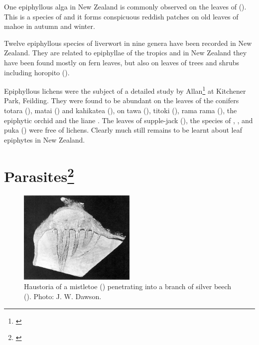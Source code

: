 One epiphyllous alga in New Zealand is commonly observed on the leaves of  ().
This is a species of  and it forms conspicuous reddish patches on old leaves of mahoe in autumn and winter.

Twelve epiphyllous species of liverwort in nine genera have been recorded in New Zealand.
They are related to epiphyllae of the tropics and in New Zealand they have been found mostly on fern leaves, but also on leaves of trees and shrubs including horopito ().

Epiphyllous lichens were the subject of a detailed study by Allan\footnote{\cite{zahlbruckner1928epiphyllous}} at Kitchener Park, Feilding.
They were found to be abundant on the leaves of the conifers totara (), matai () and kahikatea (), on tawa (), titoki (), rama rama (), the epiphytic orchid  and the liane .
The leaves of supple-jack (), the species of , ,  and puka () were free of lichens.
Clearly much still remains to be learnt about leaf epiphytes in New Zealand.

\section[Parasites]{Parasites\footnote{\cite{fineran1974parasitic}}}

\begin{figure}
	\includegraphics[width=0.5\textwidth]{graphics/figure57mistletoe-haustoria.jpg}
	\centering
	\caption[Haustoria of a mistletoe]{Haustoria of a mistletoe () penetrating into a branch of silver beech ().
	Photo: J. W. Dawson.}%
	\label{fig:57mistletoe-haustori}
\end{figure}

